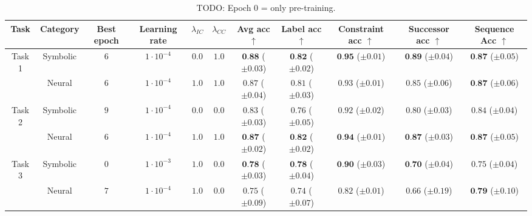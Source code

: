 \begin{table}[!t]
\centering
	\begin{tabular}{ccccccccccc}
		\toprule
		Task & Category & Best epoch & Learning rate & $\lambda_{IC}$ & $\lambda_{CC}$ & Avg acc $\uparrow$ & Label acc $\uparrow$ & Constraint acc $\uparrow$ & Successor acc $\uparrow$ & Sequence Acc $\uparrow$\\
		\midrule
		\multirow{2}{*}{Task 1} & Symbolic & $6$ & $1 \cdot 10^{-4}$ & $0.0$ & $1.0$ & $\textbf{0.88} $ {\tiny ($\pm 0.03$)} & $\textbf{0.82} $ {\tiny ($\pm 0.02$)} & $\textbf{0.95} $ {\tiny ($\pm 0.01$)} & $\textbf{0.89} $ {\tiny ($\pm 0.04$)} & $\textbf{0.87} $ {\tiny ($\pm 0.05$)}\\
		& Neural & $6$ & $1 \cdot 10^{-4}$ & $1.0$ & $1.0$ & $0.87 $ {\tiny ($\pm 0.04$)} & $0.81 $ {\tiny ($\pm 0.03$)} & $0.93 $ {\tiny ($\pm 0.01$)} & $0.85 $ {\tiny ($\pm 0.06$)} & $\textbf{0.87} $ {\tiny ($\pm 0.06$)}\\
		\midrule
		\multirow{2}{*}{Task 2} & Symbolic & $9$ & $1 \cdot 10^{-4}$ & $0.0$ & $0.0$ & $0.83 $ {\tiny ($\pm 0.03$)} & $0.76 $ {\tiny ($\pm 0.05$)} & $0.92 $ {\tiny ($\pm 0.02$)} & $0.80 $ {\tiny ($\pm 0.03$)} & $0.84 $ {\tiny ($\pm 0.04$)}\\
		& Neural & $6$ & $1 \cdot 10^{-4}$ & $1.0$ & $1.0$ & $\textbf{0.87} $ {\tiny ($\pm 0.02$)} & $\textbf{0.82} $ {\tiny ($\pm 0.02$)} & $\textbf{0.94} $ {\tiny ($\pm 0.01$)} & $\textbf{0.87} $ {\tiny ($\pm 0.03$)} & $\textbf{0.87} $ {\tiny ($\pm 0.05$)}\\
		\midrule
		\multirow{2}{*}{Task 3} & Symbolic & $0$ & $1 \cdot 10^{-3}$ & $1.0$ & $0.0$ & $\textbf{0.78} $ {\tiny ($\pm 0.03$)} & $\textbf{0.78} $ {\tiny ($\pm 0.04$)} & $\textbf{0.90} $ {\tiny ($\pm 0.03$)} & $\textbf{0.70} $ {\tiny ($\pm 0.04$)} & $0.75 $ {\tiny ($\pm 0.04$)}\\
		& Neural & $7$ & $1 \cdot 10^{-4}$ & $1.0$ & $0.0$ & $0.75 $ {\tiny ($\pm 0.09$)} & $0.74 $ {\tiny ($\pm 0.07$)} & $0.82 $ {\tiny ($\pm 0.01$)} & $0.66 $ {\tiny ($\pm 0.19$)} & $\textbf{0.79} $ {\tiny ($\pm 0.10$)}\\
		
		\bottomrule
	\end{tabular}
\caption{TODO: Epoch 0 = only pre-training.}
\end{table}

